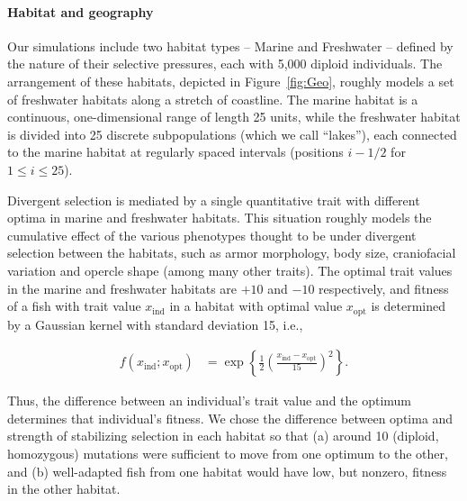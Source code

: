 \documentclass{article}
\begin{document}
\paragraph{Habitat and geography}

Our simulations include two habitat types -- Marine and Freshwater -- defined by the nature of their selective pressures, each with 5,000 diploid individuals. 
The arrangement of these habitats, depicted in Figure~\ref{fig:Geo}, roughly models a set of freshwater habitats along a stretch of coastline. 
The marine habitat is a continuous, one-dimensional range of length 25 units, while the freshwater habitat is divided into 25 discrete subpopulations (which we call ``lakes''), each connected to the marine habitat at regularly spaced intervals (positions $i - 1/2$ for $1 \le i \le 25$).

Divergent selection is mediated by a single quantitative trait with different optima in marine and freshwater habitats. 
This situation roughly models the cumulative effect of the various phenotypes thought to be under divergent selection between the habitats, such as armor morphology, body size, craniofacial variation and opercle shape (among many other traits). 
The optimal trait values in the marine and freshwater habitats are $+10$ and $-10$ respectively, and fitness of a fish with trait value $x_\text{ind}$ in a habitat with optimal value $x_\text{opt}$ is determined by a Gaussian kernel with standard deviation 15, i.e.,

\begin{align*}
    f(x_\text{ind}; x_\text{opt})
    &=
    \exp\left\{
        \frac{1}{2}
            \left(
            \frac{x_\text{ind}-x_\text{opt}}{15}
            \right)^2
        \right\} .
\end{align*}

Thus, the difference between an individual's trait value and the optimum determines that individual's fitness. 
We chose the difference between optima and strength of stabilizing selection in each habitat so that (a) around 10 (diploid, homozygous) mutations were sufficient to move from one optimum to the other, and (b) well-adapted fish from one habitat would have low, but nonzero, fitness in the other habitat.
\end{document}
